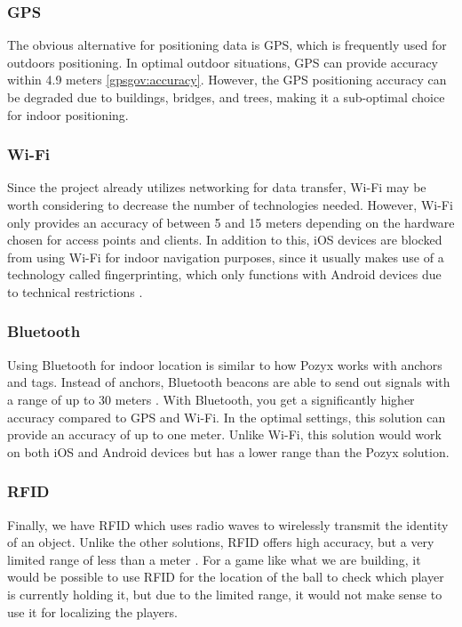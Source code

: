\subsubsection{GPS}
The obvious alternative for positioning data is GPS, which is frequently used for outdoors positioning.
In optimal outdoor situations, GPS can provide accuracy within 4.9 meters \ref{gpsgov:accuracy}.
However, the GPS positioning accuracy can be degraded due to buildings, bridges, and trees, making it a sub-optimal choice for indoor positioning.

\subsubsection{Wi-Fi}
Since the project already utilizes networking for data transfer, Wi-Fi may be worth considering to decrease the number of technologies needed.
However, Wi-Fi only provides an accuracy of between 5 and 15 meters depending on the hardware chosen for access points and clients.
In addition to this, iOS devices are blocked from using Wi-Fi for indoor navigation purposes, since it usually makes use of a technology called fingerprinting, which only functions with Android devices due to technical restrictions \cite{infsoft:wifi}.

\subsubsection{Bluetooth}
Using Bluetooth for indoor location is similar to how Pozyx works with anchors and tags.
Instead of anchors, Bluetooth beacons are able to send out signals with a range of up to 30 meters \cite{infsoft:bluetooth}.
With Bluetooth, you get a significantly higher accuracy compared to GPS and Wi-Fi.
In the optimal settings, this solution can provide an accuracy of up to one meter.
Unlike Wi-Fi, this solution would work on both iOS and Android devices but has a lower range than the Pozyx solution.

\subsubsection{RFID}
Finally, we have RFID which uses radio waves to wirelessly transmit the identity of an object.
Unlike the other solutions, RFID offers high accuracy, but a very limited range of less than a meter \cite{infsoft:rfid}.
For a game like what we are building, it would be possible to use RFID for the location of the ball to check which player is currently holding it, but due to the limited range, it would not make sense to use it for localizing the players.

